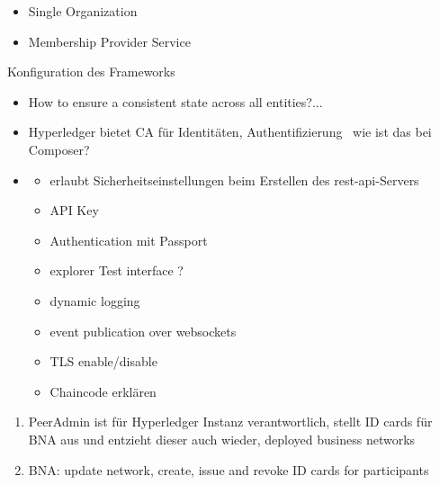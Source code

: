         \begin{itemize}[noitemsep]
            \item Single Organization 
            \item Membership Provider Service
        \end{itemize}
        
        Konfiguration des Frameworks
        \begin{itemize}[noitemsep]
            \item How to ensure a consistent state across all entities?...
            \item Hyperledger bietet CA für Identitäten, Authentifizierung \textrightarrow\ wie ist das bei Composer?
            \item \begin{itemize}
                \item erlaubt Sicherheitseinstellungen beim Erstellen des \gls{rest}-\gls{api}-Servers
                \item API Key
                \item Authentication mit Passport
                \item explorer Test interface ?
                \item dynamic logging
                \item event publication over websockets
                \item TLS enable/\-disable
                \item Chaincode erklären
            \end{itemize}
        \end{itemize}
    

\begin{enumerate}
    \item PeerAdmin ist für Hyperledger Instanz verantwortlich, stellt ID cards für BNA aus und entzieht dieser auch wieder, deployed business networks
    \item BNA: update network, create, issue and revoke ID cards for participants
\end{enumerate}
